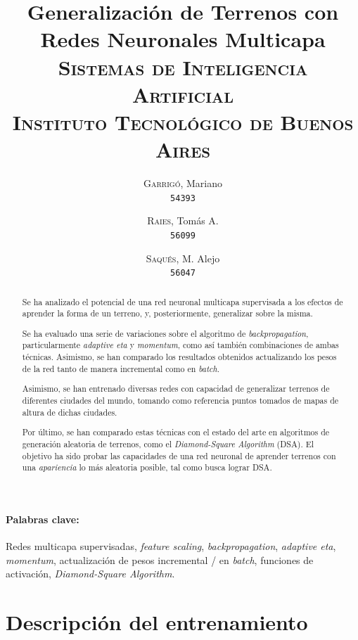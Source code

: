 \documentclass[12pt, twocolumn]{article}
\begin{document}
	\title{Generalización de Terrenos con Redes Neuronales Multicapa \\ 
		   \large{\textsc{Sistemas de Inteligencia Artificial}} \\
		   \normalsize{\textsc{Instituto Tecnológico de Buenos Aires}}}
	\author{
		\textsc{Garrigó}, Mariano \\
		\texttt{54393}
		\and
		\textsc{Raies}, Tomás A. \\
		\texttt{56099}
		\and
		\textsc{Saqués}, M. Alejo \\
		\texttt{56047} 
	}
	\date{}
	\maketitle
	
	\begin{abstract}
		Se ha analizado el potencial de una red neuronal multicapa supervisada a los efectos de aprender la forma de un terreno, y, posteriormente, generalizar sobre la misma.
		
		Se ha evaluado una serie de variaciones sobre el algoritmo de \textit{backpropagation}, particularmente \textit{adaptive eta} y \textit{momentum}, como así también combinaciones de ambas técnicas. Asimismo, se han comparado los resultados obtenidos actualizando los pesos de la red tanto de manera incremental como en \textit{batch}. 
		
		Asimismo, se han entrenado diversas redes con capacidad de generalizar terrenos de diferentes ciudades del mundo, tomando como referencia puntos tomados de mapas de altura de dichas ciudades.
		
		Por último, se han comparado estas técnicas con el estado del arte en algoritmos de generación aleatoria de terrenos, como el \textit{Diamond-Square Algorithm} (DSA). El objetivo ha sido probar las capacidades de una red neuronal de aprender terrenos con una \textit{apariencia} lo más aleatoria posible, tal como busca lograr DSA. 
	\end{abstract}
	
	\paragraph{Palabras clave:} Redes multicapa supervisadas, \textit{feature scaling}, \textit{backpropagation}, \textit{adaptive eta}, \textit{momentum}, actualización de pesos incremental / en \textit{batch}, funciones de activación, \textit{Diamond-Square Algorithm}.
	
	\section{Descripción del entrenamiento}
	
\end{document}
